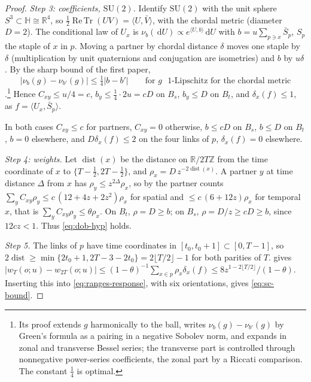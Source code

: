 \documentclass[11pt,a4paper]{amsart}
\theoremstyle{definition}
\theoremstyle{remark}
\numberwithin{equation}{section}
\DeclareMathOperator{\ReTr}{Re\,Tr}  %
\newcommand{\R}{\mathbb{R}}          %
\newcommand{\Z}{\mathbb{Z}}          %
\newcommand{\ip}[2]{\langle #1,#2\rangle}  %
\newcommand{\abs}[1]{\lvert #1\rvert}      %
\newcommand{\dd}{\,\mathrm{d}}             %
\newcommand{\SU}{\mathrm{SU}}              %
\begin{document}
\begin{proof}
\emph{Step 3: coefficients, $\SU(2)$.} Identify $\SU(2)$ with the unit sphere $S^3\subset\mathbb H\cong\R^4$, so $\frac12\ReTr(UV)=\ip{U}{\bar V}$, with the chordal metric (diameter $D=2$). The conditional law of $U_x$ is $\nu_b(\dd U)\propto e^{\ip{U}{b}}\dd U$ with $b=u\sum_{p\ni x}\bar S_p$, $S_p$ the staple of $x$ in $p$. Moving a partner by chordal distance $\delta$ moves one staple by $\delta$ (multiplication by unit quaternions and conjugation are isometries) and $b$ by $u\delta$. By the sharp bound of the first paper,
\begin{equation}\label{eq:sc-quarter}
\abs{\nu_b(g)-\nu_{b'}(g)}\le\tfrac14\abs{b-b'}\qquad\text{for $g$ $1$-Lipschitz for the chordal metric}
\end{equation}
\cite[Thm.~A1]{bhattacharjee2026first}.\footnote{Its proof extends $g$ harmonically to the ball, writes $\nu_b(g)-\nu_{b'}(g)$ by Green's formula as a pairing in a negative Sobolev norm, and expands in zonal and transverse Bessel series; the transverse part is controlled through nonnegative power-series coefficients, the zonal part by a Riccati comparison. The constant $\frac14$ is optimal.} Hence $C_{xy}\le u/4=c$, $b_y\le\frac14\cdot2u=cD$ on $B_s$, $b_y\le D$ on $B_t$, and $\delta_x(f)\le1$, as $f=\ip{U_x}{\bar S_p}$.

In both cases $C_{xy}\le c$ for partners, $C_{xy}=0$ otherwise, $b\le cD$ on $B_s$, $b\le D$ on $B_t$, $b=0$ elsewhere, and $D\delta_x(f)\le2$ on the four links of $p$, $\delta_x(f)=0$ elsewhere.

\emph{Step 4: weights.} Let $\operatorname{dist}(x)$ be the distance on $\R/2T\Z$ from the time coordinate of $x$ to $\{T-\frac12,2T-\frac12\}$, and $\rho_x=D\,z^{-2\operatorname{dist}(x)}$. A partner $y$ at time distance $\Delta$ from $x$ has $\rho_y\le z^{2\Delta}\rho_x$, so by the partner counts $\sum_yC_{xy}\rho_y\le c\,(12+4z+2z^2)\rho_x$ for spatial and $\le c\,(6+12z)\rho_x$ for temporal $x$, that is $\sum_yC_{xy}\rho_y\le\theta\rho_x$. On $B_t$, $\rho=D\ge b$; on $B_s$, $\rho=D/z\ge cD\ge b$, since $12cz<1$. Thus \eqref{eq:dob-hyp} holds.

\emph{Step 5.} The links of $p$ have time coordinates in $[t_0,t_0+1]\subset[0,T-1]$, so $2\operatorname{dist}\ge\min\{2t_0+1,2T-3-2t_0\}=2\lfloor T/2\rfloor-1$ for both parities of $T$.  gives $\abs{w_T(o;u)-w_{2T}(o;u)}\le(1-\theta)^{-1}\sum_{x\in p}\rho_x\delta_x(f)\le8z^{1-2\lfloor T/2\rfloor}/(1-\theta)$. Inserting this into \eqref{eq:ranges-response}, with six orientations, gives \eqref{eq:sc-bound}.
\end{proof}
\end{document}
